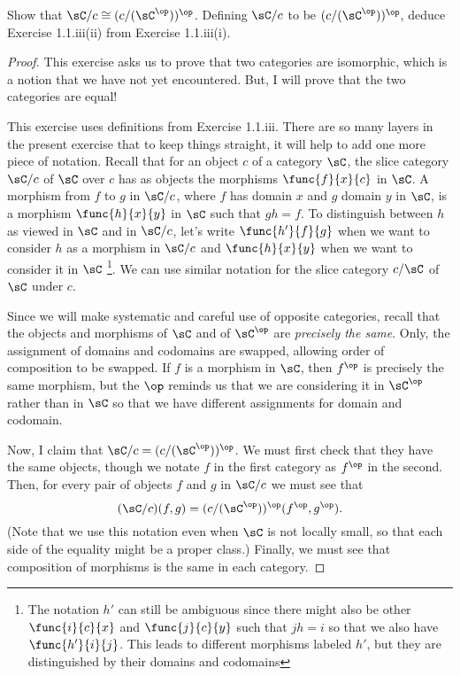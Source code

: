\documentclass[main.tex]{subfiles}
\begin{document}
\begin{exercise}
	Show that \(\sC/c\cong(c/(\sC^\op ))^\op\). Defining \(\sC/c\) to be
	\((c/(\sC^\op))^\op\), deduce Exercise 1.1.iii(ii) from Exercise 1.1.iii(i).
\end{exercise}

\begin{proof}
	This exercise asks us to prove that two categories are isomorphic, which is
	a notion that we have not yet encountered. But, I will prove that the two
	categories are equal!

	This exercise uses definitions from Exercise 1.1.iii. There are so many
	layers in the present exercise that to keep things straight, it will help to
	add one more piece of notation. Recall that for an object \(c\) of a
	category \(\sC\), the slice category \(\sC/c\) of \(\sC\) over \(c\) has as
	objects the morphisms \(\func{f}{x}{c}\) in \(\sC\). A morphism from \(f\)
	to \(g\) in \(\sC/c\), where \(f\) has domain \(x\) and \(g\) domain \(y\)
	in \(\sC\), is a morphism \(\func{h}{x}{y}\) in \(\sC\) such that \(gh=f\).
	To distinguish between \(h\) as viewed in \(\sC\) and in \(\sC/c\), let's
	write \(\func{h'}{f}{g}\) when we want to consider \(h\) as a morphism in
	\(\sC/c\) and \(\func{h}{x}{y}\) when we want to consider it in \(\sC\)%
	\footnote{The notation \(h'\) can still be ambiguous since there might also
		be other \(\func{i}{c}{x}\) and \(\func{j}{c}{y}\) such that \(jh=i\) so
		that we also have \(\func{h'}{i}{j}\). This leads to different morphisms
		labeled \(h'\), but they are distinguished by their domains and
	codomains}. We can use similar notation for the slice category \(c/\sC\) of
	\(\sC\) under \(c\).

	Since we will make systematic and careful use of opposite categories, recall
	that the objects and morphisms of \(\sC\) and of \(\sC^\op\) are
	\emph{precisely the same}. Only, the assignment of domains and codomains are
	swapped, allowing order of composition to be swapped. If \(f\) is a morphism
	in \(\sC\), then \(f^\op\) is precisely the same morphism, but the \(\op\)
	reminds us that we are considering it in \(\sC^\op\) rather than in \(\sC\)
	so that we have different assignments for domain and codomain.

	Now, I claim that \(\sC/c=(c/(\sC^\op))^\op\). We must first check that they
	have the same objects, though we notate \(f\) in the first category as
	\(f^\op\) in the second. Then, for every pair of objects \(f\) and \(g\) in
	\(\sC/c\) we must see that \[(\sC/c)(f,g)=(c/(\sC^\op))^\op(f^\op, g^\op).\]
	(Note that we use this notation even when \(\sC\) is not locally small, so
	that each side of the equality might be a proper class.) Finally, we must
	see that composition of morphisms is the same in each category.


\end{proof}
\end{document}
